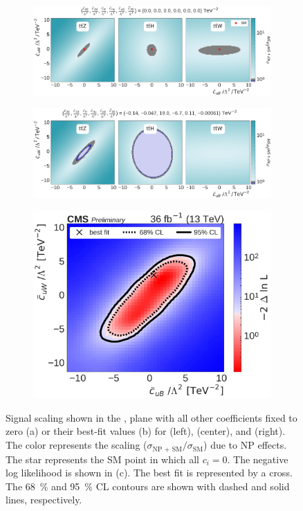 \begin{figure}
  \vspace{-1cm}
  \begin{subfigure}{\linewidth}
    \centering
    \includegraphics[width=\linewidth]{figures/thirteen-TeV/scaling-frozen/cuB_cuW}
    \caption{}
  \end{subfigure}
  \begin{subfigure}{\linewidth}
    \centering
    \includegraphics[width=\linewidth]{figures/thirteen-TeV/scaling/cuB_cuW}
    \caption{}
  \end{subfigure}
  \begin{subfigure}{\linewidth}
    \centering
    \includegraphics[width=0.6\linewidth]{figures/thirteen-TeV/nll/cuB_cuW}
    \caption{}
  \end{subfigure}
  \vspace{-1cm}
  \setlength{\capwidth}{15cm}
  \caption[Signal scaling and profile likelihood scan in the \cuB, \cuW plane]{Signal scaling shown
  in the \cuB, \cuW plane with all other coefficients fixed to zero (a) or their best-fit values (b)
  for \ttZ (left), \ttH (center), and \ttW (right). The color represents the scaling ($\sigma_\text{NP
  + SM} / \sigma_\text{SM}$) due to NP effects. The star represents the SM point in which all $c_i=0$.
  The negative log likelihood is shown in (c). The best fit is represented by a cross. The
  \SI{68}{\percent} and \SI{95}{\percent} CL contours are shown with dashed and solid lines,
  respectively.}
\end{figure}


